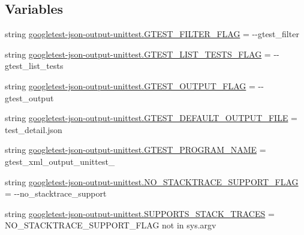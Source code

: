 \subsection*{Variables}
\begin{DoxyCompactItemize}
\item 
string \mbox{\hyperlink{namespacegoogletest-json-output-unittest_a78119267ed683b37bd90af318fb29136}{googletest-\/json-\/output-\/unittest.\+G\+T\+E\+S\+T\+\_\+\+F\+I\+L\+T\+E\+R\+\_\+\+F\+L\+AG}} = \textquotesingle{}-\/-\/gtest\+\_\+filter\textquotesingle{}
\item 
string \mbox{\hyperlink{namespacegoogletest-json-output-unittest_a1a5125bd96035d59b431fca5acb10b37}{googletest-\/json-\/output-\/unittest.\+G\+T\+E\+S\+T\+\_\+\+L\+I\+S\+T\+\_\+\+T\+E\+S\+T\+S\+\_\+\+F\+L\+AG}} = \textquotesingle{}-\/-\/gtest\+\_\+list\+\_\+tests\textquotesingle{}
\item 
string \mbox{\hyperlink{namespacegoogletest-json-output-unittest_addc3fef6d837287e9d52447a7fd4ec6e}{googletest-\/json-\/output-\/unittest.\+G\+T\+E\+S\+T\+\_\+\+O\+U\+T\+P\+U\+T\+\_\+\+F\+L\+AG}} = \textquotesingle{}-\/-\/gtest\+\_\+output\textquotesingle{}
\item 
string \mbox{\hyperlink{namespacegoogletest-json-output-unittest_a6993deaa84410f54cfa9739f91998ab3}{googletest-\/json-\/output-\/unittest.\+G\+T\+E\+S\+T\+\_\+\+D\+E\+F\+A\+U\+L\+T\+\_\+\+O\+U\+T\+P\+U\+T\+\_\+\+F\+I\+LE}} = \textquotesingle{}test\+\_\+detail.\+json\textquotesingle{}
\item 
string \mbox{\hyperlink{namespacegoogletest-json-output-unittest_a2ea5e671c35eb461f41c0a5d720fed9d}{googletest-\/json-\/output-\/unittest.\+G\+T\+E\+S\+T\+\_\+\+P\+R\+O\+G\+R\+A\+M\+\_\+\+N\+A\+ME}} = \textquotesingle{}gtest\+\_\+xml\+\_\+output\+\_\+unittest\+\_\+\textquotesingle{}
\item 
string \mbox{\hyperlink{namespacegoogletest-json-output-unittest_a6ddd6eb87b18fe709a35787ad5a2cceb}{googletest-\/json-\/output-\/unittest.\+N\+O\+\_\+\+S\+T\+A\+C\+K\+T\+R\+A\+C\+E\+\_\+\+S\+U\+P\+P\+O\+R\+T\+\_\+\+F\+L\+AG}} = \textquotesingle{}-\/-\/no\+\_\+stacktrace\+\_\+support\textquotesingle{}
\item 
string \mbox{\hyperlink{namespacegoogletest-json-output-unittest_a6dfc09d904d4cafa17a375a9b1d579bf}{googletest-\/json-\/output-\/unittest.\+S\+U\+P\+P\+O\+R\+T\+S\+\_\+\+S\+T\+A\+C\+K\+\_\+\+T\+R\+A\+C\+ES}} = N\+O\+\_\+\+S\+T\+A\+C\+K\+T\+R\+A\+C\+E\+\_\+\+S\+U\+P\+P\+O\+R\+T\+\_\+\+F\+L\+AG not in sys.\+argv
\item 

\end{DoxyCompactItemize}
